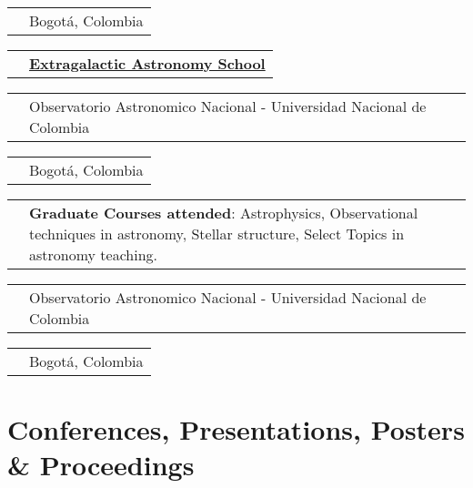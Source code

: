 \documentclass[11pt,letterpaper,sans]{moderncv}        %
\makeatletter
\renewcommand*{\cvitem}[3][.25em]{%
  \begin{tabular}{@{}p{\hintscolumnwidth}@{\hspace{\separatorcolumnwidth}}p{\maincolumnwidth}@{}}%
      \raggedleft\hintstyle{#2} &{#3}%
  \end{tabular}%
  \par\addvspace{#1}}
\makeatother
\begin{document}
\cvitem{}{Bogot\'a, Colombia}
\newpage
\cvitem{Aug 9 - 11}{\href{http://www.observatorio.unal.edu.co/eventos/pasados/cocoa/escuela.html}{\textbf{Extragalactic Astronomy School}}}
\cvitem{2010}{Observatorio Astronomico Nacional - Universidad Nacional de Colombia}
\cvitem{}{Bogot\'a, Colombia}
\cvitem{2012 -2013}{\textbf{Graduate Courses attended}: Astrophysics, Observational techniques in astronomy, Stellar structure, Select Topics in astronomy teaching.}
\cvitem{}{Observatorio Astronomico Nacional - Universidad Nacional de Colombia}
\cvitem{}{Bogot\'a, Colombia}
\section{Conferences, Presentations, Posters \& Proceedings}
\end{document}
